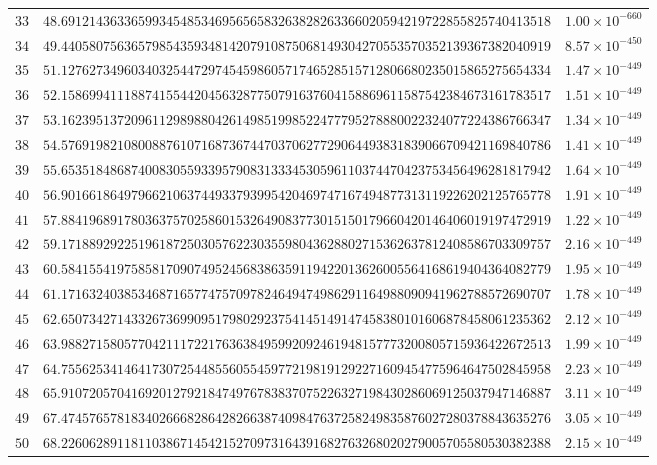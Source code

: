 \documentclass[12pt,reqno]{amsart}
\theoremstyle{remark}
\begin{document}
\begin{longtable}{clc}
$33$ & $48.6912143633659934548534695656583263828263366020594219722855825740413518$ & $1.00\times 10^{-660}$ \\
$34$ & $49.4405807563657985435934814207910875068149304270553570352139367382040919$ & $8.57\times 10^{-450}$ \\
$35$ & $51.1276273496034032544729745459860571746528515712806680235015865275654334$ & $1.47\times 10^{-449}$ \\
$36$ & $52.1586994111887415544204563287750791637604158869611587542384673161783517$ & $1.51\times 10^{-449}$ \\
$37$ & $53.1623951372096112989880426149851998522477795278880022324077224386766347$ & $1.34\times 10^{-449}$ \\
$38$ & $54.5769198210800887610716873674470370627729064493831839066709421169840786$ & $1.41\times 10^{-449}$ \\
$39$ & $55.6535184868740083055933957908313334530596110374470423753456496281817942$ & $1.64\times 10^{-449}$ \\
$40$ & $56.9016618649796621063744933793995420469747167494877313119226202125765778$ & $1.91\times 10^{-449}$ \\
$41$ & $57.8841968917803637570258601532649083773015150179660420146406019197472919$ & $1.22\times 10^{-449}$ \\
$42$ & $59.1718892922519618725030576223035598043628802715362637812408586703309757$ & $2.16\times 10^{-449}$ \\
$43$ & $60.5841554197585817090749524568386359119422013626005564168619404364082779$ & $1.95\times 10^{-449}$ \\
$44$ & $61.1716324038534687165774757097824649474986291164988090941962788572690707$ & $1.78\times 10^{-449}$ \\
$45$ & $62.6507342714332673699095179802923754145149147458380101606878458061235362$ & $2.12\times 10^{-449}$ \\
$46$ & $63.9882715805770421117221763638495992092461948157773200805715936422672513$ & $1.99\times 10^{-449}$ \\
$47$ & $64.7556253414641730725448556055459772198191292271609454775964647502845958$ & $2.23\times 10^{-449}$ \\
$48$ & $65.9107205704169201279218474976783837075226327198430286069125037947146887$ & $3.11\times 10^{-449}$ \\
$49$ & $67.4745765781834026668286428266387409847637258249835876027280378843635276$ & $3.05\times 10^{-449}$ \\
$50$ & $68.2260628911811038671454215270973164391682763268020279005705580530382388$ & $2.15\times 10^{-449}$ \\

\end{longtable}
\end{document}

